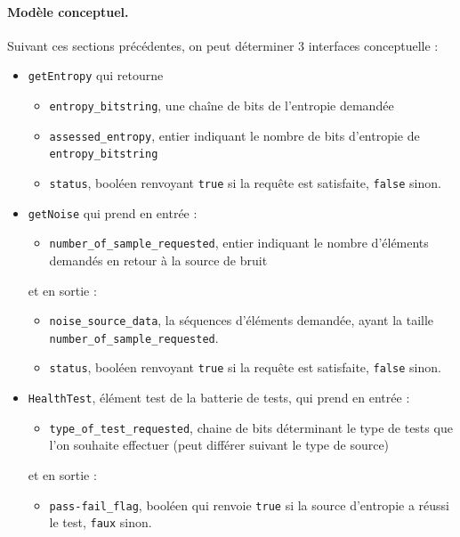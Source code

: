 \paragraph{Modèle conceptuel.\\}
Suivant ces sections précédentes, on peut déterminer 3 interfaces conceptuelle :
\begin{itemize}
\item \texttt{getEntropy} qui retourne 
	\begin{itemize}
	\item \texttt{entropy\_bitstring}, une chaîne de bits de l'entropie demandée
	\item \texttt{assessed\_entropy}, entier indiquant le nombre de bits d'entropie de \texttt{entropy\_bitstring}
	\item \texttt{status}, booléen renvoyant \texttt{true} si la requête est satisfaite, \texttt{false} sinon.\\
	\end{itemize}
\item \texttt{getNoise}	 qui prend en entrée : 
	\begin{itemize}
	\item \texttt{number\_of\_sample\_requested}, entier indiquant le nombre d'éléments demandés en retour à la source de bruit
	\end{itemize}
et en sortie : 
	\begin{itemize}
	\item \texttt{noise\_source\_data}, la séquences d'éléments demandée, ayant la taille \texttt{number\_of\_sample\_requested}.
	\item \texttt{status}, booléen renvoyant \texttt{true} si la requête est satisfaite, \texttt{false} sinon.\\
	\end{itemize}
\item \texttt{HealthTest}, élément test de la batterie de tests, qui prend en entrée :
	\begin{itemize}
	\item \texttt{type\_of\_test\_requested}, chaine de bits déterminant le type de tests que l'on souhaite effectuer (peut différer suivant le type de source)
	\end{itemize}
et en sortie : 
	\begin{itemize}
	\item \texttt{pass-fail\_flag}, booléen qui renvoie \texttt{true} si la source d'entropie a réussi le test, \texttt{faux} sinon.
	\end{itemize}	
\end{itemize}




